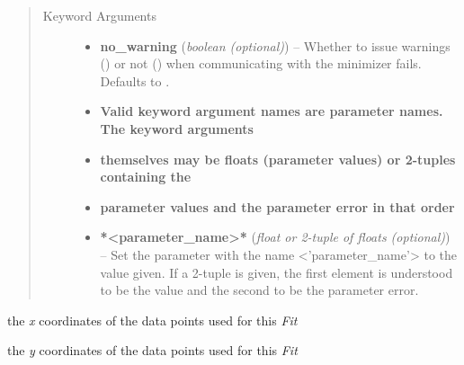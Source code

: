 \documentclass[a4paper,10pt,english]{sphinxmanual}
\begin{document}
\begin{fulllineitems}
\begin{fulllineitems}
\begin{quote}
\begin{description}
\begin{itemize}
\end{itemize}

\item[{Keyword Arguments}] \leavevmode\begin{itemize}
\item {} 
\textbf{no\_warning} (\emph{boolean (optional)}) --
Whether to issue warnings () or not () when
communicating with the minimizer fails. Defaults to .

\item {} 
\textbf{Valid keyword argument names are parameter names. The keyword arguments}

\item {} 
\textbf{themselves may be floats (parameter values) or 2-tuples containing the}

\item {} 
\textbf{parameter values and the parameter error in that order}

\item {} 
\textbf{*\textless{}parameter\_name\textgreater{}*} (\emph{float or 2-tuple of floats (optional)}) --
Set the parameter with the name \textless{}'parameter\_name'\textgreater{} to the value
given. If a 2-tuple is given, the first element is understood
to be the value and the second to be the parameter error.

\end{itemize}

\end{description}\end{quote}

\end{fulllineitems}


\begin{fulllineitems}
\label{index:kafe.fit.Fit.xdata}
the \emph{x} coordinates of the data points used for this \emph{Fit}

\end{fulllineitems}


\begin{fulllineitems}
\label{index:kafe.fit.Fit.ydata}
the \emph{y} coordinates of the data points used for this \emph{Fit}

\end{fulllineitems}


\end{fulllineitems}
\end{document}
